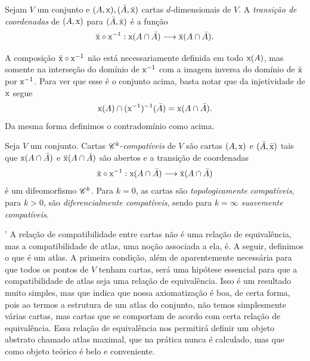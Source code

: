 \begin{defi}
Sejam $V$ um conjunto e $(A,\mathrm{x}),(\bar A,\bar{\mathrm{x}})$ cartas $d$-dimensionais de $V$. A \emph{transição de coordenadas} de $(A,\mathrm{x})$ para $(\bar A,\bar{\mathrm{x}})$ é a função
	\begin{equation*}
	\bar{\mathrm{x}} \circ \mathrm{x}^{-1}: \mathrm{x}(A \cap \bar A) \longrightarrow \bar{\mathrm{x}}(A \cap \bar A).
	\end{equation*}
\end{defi}

A composição $\bar{\mathrm{x}} \circ \mathrm{x}^{-1}$ não está necessariamente definida em todo $\mathrm{x}(A)$, mas somente na interseção do domínio de $\mathrm{x}^{-1}$ com a imagem inversa do domínio de $\bar{\mathrm{x}}$ por $\mathrm{x}^{-1}$. Para ver que esse é o conjunto acima, basta notar que da injetividade de $\mathrm{x}$ segue
	\begin{equation*}
	\mathrm{x}(A) \cap (\mathrm{x}^{-1})^{-1}(\bar A) = \mathrm{x}(A \cap \bar A).
	\end{equation*}
Da mesma forma definimos o contradomínio como acima.

\begin{defi}
Seja $V$ um conjunto. Cartas $\mathscr{C}^k$-\emph{compatíveis} de $V$ são cartas $(A,\mathrm{x})$ e $(\bar A,\bar{\mathrm{x}})$ tais que $\mathrm{x}(A \cap \bar A)$ e $\bar{\mathrm{x}}(A \cap \bar A)$ são abertos e a transição de coordenadas
	\begin{equation*}
	\bar{\mathrm{x}} \circ \mathrm{x}^{-1}: \mathrm{x}(A \cap \bar A) \longrightarrow \bar{\mathrm{x}}(A \cap \bar A)
	\end{equation*}
é um difeomorfismo $\mathscr{C}^k$. Para $k=0$, as cartas são \emph{topologicamente compatíveis}, para $k>0$, são \emph{diferencialmente compatíveis}, sendo para $k=\infty$ \emph{suavemente compatíveis}.
\end{defi}
'
A relação de compatibilidade entre cartas não é uma relação de equivalência, mas a compatibilidade de atlas, uma noção associada a ela, é. A seguir, definimos o que é um atlas. A primeira condição, além de aparentemente necessária para que todos os pontos de $V$ tenham cartas, será uma hipótese essencial para que a compatibilidade de atlas seja uma relação de equivalência. Isso é um resultado muito simples, mas que indica que nossa axiomatização é boa, de certa forma, pois ao termos a estrutura de um atlas do conjunto, não temos simplesmente várias cartas, mas cartas que se comportam de acordo com certa relação de equivalência. Essa relação de equivalência nos permitirá definir um objeto abstrato chamado atlas maximal, que na prática nunca é calculado, mas que como objeto teórico é belo e conveniente.

